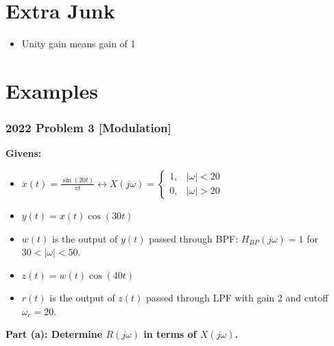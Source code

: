 \documentclass[10pt, twocolumn]{article}
\begin{document}
\section{Extra Junk}
\begin{itemize}
    \item Unity gain means gain of 1
\end{itemize}

\section{Examples}
\subsubsection*{2022 Problem 3 [Modulation]}
\noindent\textbf{Givens:}
\begin{itemize}
    \item $x(t) = \frac{\sin(20t)}{\pi t} \leftrightarrow X(j\omega) = \begin{cases} 1, & |\omega| < 20 \\ 0, & |\omega| > 20 \end{cases}$
    \item $y(t) = x(t)\cos(30t)$
    \item $w(t)$ is the output of $y(t)$ passed through BPF: $H_{BP}(j\omega)=1$ for $30 < |\omega| < 50$.
    \item $z(t) = w(t)\cos(40t)$
    \item $r(t)$ is the output of $z(t)$ passed through LPF with gain 2 and cutoff $\omega_c = 20$.
\end{itemize}
\noindent\textbf{Part (a): Determine $R(j\omega)$ in terms of $X(j\omega)$.}
\end{document}
